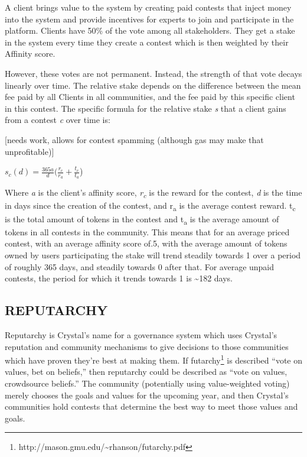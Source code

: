 A client brings value to the system by creating paid contests that
inject money into the system and provide incentives for experts to join
and participate in the platform. Clients have 50\% of the vote among all
stakeholders. They get a stake in the system every time they create a
contest which is then weighted by their Affinity score.

However, these votes are not permanent. Instead, the strength of that
vote decays linearly over time. The relative stake depends on the
difference between the mean fee paid by all Clients in all communities,
and the fee paid by this specific client in this contest. The specific
formula for the relative stake \emph{s} that a client gains from a
contest \emph{c} over time is:

{[}needs work, allows for contest spamming (although gas may make that
unprofitable){]}

\(s_{c}(d) = \frac{365a}{d}(\frac{r_{c}}{r_{a}} + \frac{t_{c}}{t_{a}}\))

Where \emph{a} is the client's affinity score, \emph{r\textsubscript{c
}}is the reward for the contest, \emph{d} is the time in days since the
creation of the contest, and r\textsubscript{a} is the average contest
reward. t\textsubscript{c} is the total amount of tokens in the contest
and t\textsubscript{a} is the average amount of tokens in all contests
in the community. This means that for an average priced contest, with an
average affinity score of.5, with the average amount of tokens owned by
users participating the stake will trend steadily towards 1 over a
period of roughly 365 days, and steadily towards 0 after that. For
average unpaid contests, the period for which it trends towards 1 is
\textasciitilde{}182 days.

\subsection{\texorpdfstring{\protect\hypertarget{_ju4bkmedkcsj}{}{\protect\hypertarget{_Toc462050420}{}{}}REPUTARCHY}{REPUTARCHY}}\label{reputarchy}

Reputarchy is Crystal's name for a governance system which uses
Crystal's reputation and community mechanisms to give decisions to those
communities which have proven they're best at making them. If
futarchy\footnote{http://mason.gmu.edu/\textasciitilde{}rhanson/futarchy.pdf}
is described ``vote on values, bet on beliefs,'' then reputarchy could
be described as ``vote on values, crowdsource beliefs.'' The community
(potentially using value-weighted voting) merely chooses the goals and
values for the upcoming year, and then Crystal's communities hold
contests that determine the best way to meet those values and goals.


